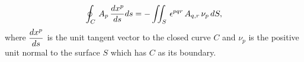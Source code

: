 \begin{theorem}
\[ \oint_C \, A_p\, {dx^p\over ds} ds = - \iint_S \, \epsilon^{pqr}\,A_{q,r}\,\nu_p\,dS, \] 
where $\displaystyle{dx^p\over ds}$ is the unit tangent vector to the closed curve $C$ and
$\nu_p$ is the positive unit normal to the surface $S$ which has $C$ as its boundary.
\end{theorem}













